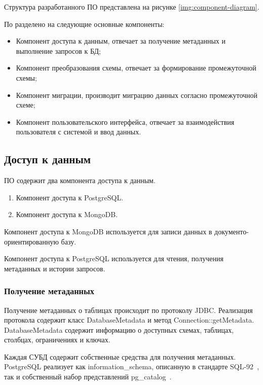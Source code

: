 Структура разработанного ПО представлена на рисунке \ref{img:component-diagram}.



По разделено на следующие основные компоненты:
\begin{itemize}[label=---]
    \item Компонент доступа к данным, отвечает за получение метаданных и выполнение запросов к БД;
    \item Компонент преобразования схемы, отвечает за формирование промежуточной схемы;
    \item Компонент миграции, производит миграцию данных согласно промежуточной схеме;
    \item Компонент пользовательского интерфейса, отвечает за взаимодействия пользователя с системой и ввод данных.
\end{itemize}

\clearpage

\subsection{Доступ к данным}

ПО содержит два компонента доступа к данным.
\begin{enumerate}
    \item Компонент доступа к PostgreSQL.
    \item Компонент доступа к MongoDB.
\end{enumerate}

Компонент доступа к MongoDB используется для записи данных в документо-ориентированную базу.

Компонент доступа к PostgreSQL используется для чтения, получения метаданных и истории запросов.

\subsubsection{Получение метаданных}
Получение метаданных о таблицах происходит по протоколу JDBC. 
Реализация протокола содержит класс \textmd{DatabaseMetadata} и метод \textmd{Connection::getMetadata}.
\textmd{DatabaseMetadata} содержит информацию о доступных схемах, таблицах, столбцах, ограничениях и ключах.

Каждая СУБД содержит собственные средства для получения метаданных. 
PostgreSQL реализует как \textmd{information\_schema}, описанную в стандарте SQL-92~\cite{sql-92},
так и собственный набор представлений \textmd{pg\_catalog}~\cite{pg-catalog}.


